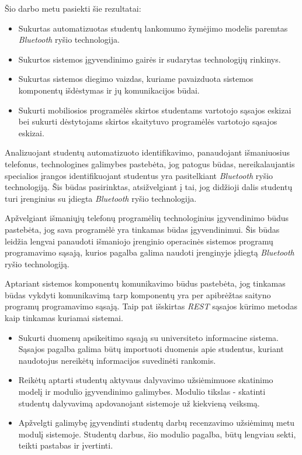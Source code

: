 \documentclass{VUMIFPSkursinis}
\begin{document}

Šio darbo metu pasiekti šie rezultatai:

\begin{itemize}
	\item Sukurtas automatizuotas studentų lankomumo žymėjimo modelis paremtas \textit{Bluetooth} ryšio technologija.
	\item Sukurtos sistemos įgyvendinimo gairės ir sudarytas technologijų rinkinys.
	\item Sukurtas sistemos diegimo vaizdas, kuriame pavaizduota sistemos komponentų išdėstymas ir jų komunikacijos būdai.
	\item Sukurti mobiliosios programėlės skirtos studentams vartotojo sąsajos eskizai bei sukurti dėstytojams skirtos skaitytuvo programėlės vartotojo sąsajos eskizai.
\end{itemize}

Analizuojant studentų automatizuoto identifikavimo, panaudojant išmaniuosius telefonus, technologines galimybes pastebėta, jog patogus būdas, nereikalaujantis specialios įrangos identifikuojant studentus yra pasitelkiant \textit{Bluetooth} ryšio technologiją. Šis būdas pasirinktas, atsižvelgiant į tai, jog didžioji dalis studentų turi įrenginius su įdiegta \textit{Bluetooth} ryšio technologija.

Apžvelgiant išmaniųjų telefonų programėlių technologinius įgyvendinimo būdus pastebėta, jog sava programėlė yra tinkamas būdas įgyvendinimui. Šis būdas leidžia lengvai panaudoti išmaniojo įrenginio operacinės sistemos programų programavimo sąsają, kurios pagalba galima naudoti įrenginyje įdiegtą \textit{Bluetooth} ryšio technologiją.

Aptariant sistemos komponentų komunikavimo būdus pastebėta, jog tinkamas būdas vykdyti komunikavimą tarp komponentų yra per apibrėžtas saityno programų programavimo sąsają. Taip pat išskirtas \textit{REST} sąsajos kūrimo metodas kaip tinkamas kuriamai sistemai.


\begin{itemize}
	\item Sukurti duomenų apsikeitimo sąsają su universiteto informacine sistema. Sąsajos pagalba galima būtų importuoti duomenis apie studentus, kuriant naudotojus nereikėtų informacijos suvedinėti rankomis.
	\item Reikėtų aptarti studentų aktyvaus dalyvavimo užsiėmimuose skatinimo modelį ir modulio įgyvendinimo galimybes. Modulio tikslas - skatinti studentų dalyvavimą apdovanojant sistemoje už kiekvieną veiksmą.
	\item Apžvelgti galimybę įgyvendinti studentų darbų recenzavimo užsiėmimų metu modulį sistemoje. Studentų darbus, šio modulio pagalba, būtų lengviau sekti, teikti pastabas ir įvertinti. 
\end{itemize}
\end{document}
